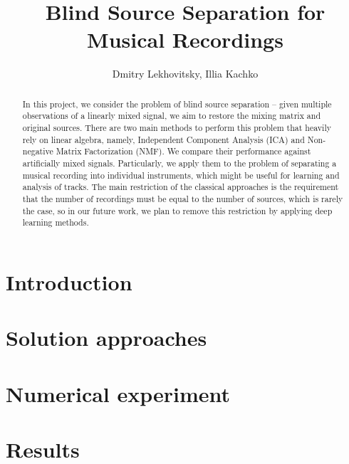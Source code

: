 \documentclass{article}
\title{ Blind Source Separation for Musical Recordings }
\author{ Dmitry Lekhovitsky, Illia Kachko }
\date{ }
\begin{document}
\maketitle

\begin{abstract}
	In this project, we consider the problem of blind source separation -- given multiple observations of a linearly mixed signal, we aim to restore the mixing matrix and original sources. There are two main methods to perform this problem that heavily rely on linear algebra, namely, Independent Component Analysis (ICA) and Non-negative Matrix Factorization (NMF). We compare their performance against artificially mixed signals.
	Particularly, we apply them to the problem of separating a musical recording into individual instruments, which might be useful for learning and analysis of tracks.
	The main restriction of the classical approaches is the requirement that the number of recordings must be equal to the number of sources, which is rarely the case, so in our future work, we plan to remove this restriction by applying deep learning methods.
\end{abstract}


\section{Introduction}


\section{Solution approaches}


\section{Numerical experiment}


\section{Results}



	
\end{document}
